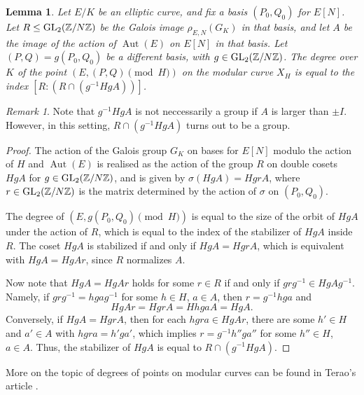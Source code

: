 \documentclass[10pt,leqno]{amsart}
\newcommand{\Z}{\mathbb{Z}}
\newcommand{\GL}{\textnormal{GL}}
\DeclareMathOperator{\Aut}{Aut}
\newtheorem{lemma}[theorem]{Lemma}
\theoremstyle{definition}
\theoremstyle{remark}
\newtheorem{remark}[theorem]{Remark}
\numberwithin{theorem}{section}
\begin{document}
\begin{lemma}
    Let $E/K$ be an elliptic curve, and fix a basis $(P_0,Q_0)$ for $E[N]$. Let $R\leq \GL_2(\Z/N\Z)$ be the Galois image $\rho_{E,N}(G_K)$ in that basis, and let $A$ be the image of the action of $\Aut(E)$ on $E[N]$ in that basis. Let $(P,Q)=g(P_0, Q_0)$ be a different basis, with $g \in \GL_2(\Z/N\Z)$.  The degree over $K$ of the point $(E, (P,Q)\pmod H)$ on the modular curve $X_H$ is equal to the index $[R:(R\cap(g^{-1}H gA))]$.
\end{lemma}
\begin{remark}
    Note that $g^{-1}HgA$ is not neccessarily a group if $A$ is larger than $\pm I$. However, in this setting, $R\cap(g^{-1}H gA)$ turns out to be a group.
\end{remark}
\begin{proof}
    The action of the Galois group $G_K$ on bases for $E[N]$ modulo the action of $H$ and $\Aut(E)$ is realised as the action of the group $R$ on double cosets $HgA$ for $g \in \GL_2(\Z/N\Z)$, and is given by $\sigma(HgA)=HgrA$, where $r\in \GL_2(\Z/N\Z)$ is the matrix determined by the action of $\sigma$ on $(P_0, Q_0)$. 
    
    The degree of $(E, g(P_0,Q_0) \pmod H)$ is equal to the size of the orbit of $HgA$ under the action of $R$, which is equal to the index of the stabilizer of $HgA$ inside $R$. The coset $HgA$ is stabilized if and only if $HgA=HgrA$, which is equivalent with $HgA=HgAr$, since $R$ normalizes $A$. 

    Now note that $HgA=HgAr$ holds for some $r \in R$ if and only if $grg^{-1} \in HgAg^{-1}$. Namely, if $grg^{-1}=hgag^{-1}$ for some $h \in H$, $a \in A$, then $r=g^{-1}hga$ and $$HgAr=HgrA=HhgaA=HgA.$$
    Conversely, if $HgA=HgrA$, then for each $hgra \in HgAr$, there are some $h' \in H$ and $a'\in A$ with $hgra=h'ga'$, which implies $r=g^{-1}h''ga''$ for some $h'' \in H$, $a \in A$. Thus, the stabilizer of $HgA$ is equal to $R \cap (g^{-1}HgA)$.
\end{proof}
\noindent More on the topic of degrees of points on modular curves can be found in Terao's article \cite{kenji}.

\end{document}
